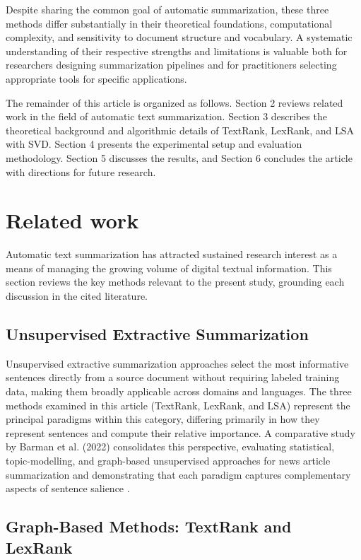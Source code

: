 \documentclass[12pt,twoside,en,win]{bmzhart}
\begin{document}
	Despite sharing the common goal of automatic summarization, these three methods differ substantially 
	in their theoretical foundations, computational complexity, and sensitivity to document structure and 
	vocabulary. A systematic understanding of their respective strengths and limitations is valuable both 
	for researchers designing summarization pipelines and for practitioners selecting appropriate tools 
	for specific applications.

	The remainder of this article is organized as follows. Section 2 reviews related work in the field 
	of automatic text summarization. Section 3 describes the theoretical background and algorithmic 
	details of TextRank, LexRank, and LSA with SVD. Section 4 presents the experimental setup and 
	evaluation methodology. Section 5 discusses the results, and Section 6 concludes the article with 
	directions for future research.

	
	\section{Related work}

	Automatic text summarization has attracted sustained research interest as a means of managing the 
	growing volume of digital textual information. This section reviews the key methods relevant to the 
	present study, grounding each discussion in the cited literature.

	\subsection{Unsupervised Extractive Summarization}

	Unsupervised extractive summarization approaches select the most informative sentences directly 
	from a source document without requiring labeled training data, making them broadly applicable 
	across domains and languages. The three methods examined in this article (TextRank, LexRank, and LSA) 
	represent the principal paradigms within this category, differing primarily in how they represent 
	sentences and compute their relative importance. A comparative study by Barman et al. (2022) 
	consolidates this perspective, evaluating statistical, topic-modelling, and graph-based unsupervised 
	approaches for news article summarization and demonstrating that each paradigm captures complementary 
	aspects of sentence salience \cite{k5}.

	\subsection{Graph-Based Methods: TextRank and LexRank}
\end{document}
